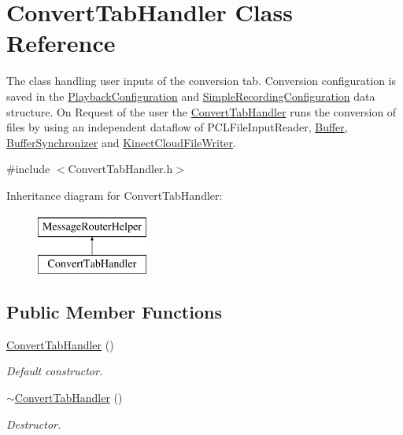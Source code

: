 \hypertarget{class_convert_tab_handler}{}\section{Convert\+Tab\+Handler Class Reference}
\label{class_convert_tab_handler}


The class handling user inputs of the conversion tab. Conversion configuration is saved in the \hyperlink{class_playback_configuration}{Playback\+Configuration} and \hyperlink{class_simple_recording_configuration}{Simple\+Recording\+Configuration} data structure. On Request of the user the \hyperlink{class_convert_tab_handler}{Convert\+Tab\+Handler} runs the conversion of files by using an independent dataflow of P\+C\+L\+File\+Input\+Reader, \hyperlink{class_buffer}{Buffer}, \hyperlink{class_buffer_synchronizer}{Buffer\+Synchronizer} and \hyperlink{class_kinect_cloud_file_writer}{Kinect\+Cloud\+File\+Writer}.  




{\ttfamily \#include $<$Convert\+Tab\+Handler.\+h$>$}

Inheritance diagram for Convert\+Tab\+Handler\+:\begin{figure}[H]
\begin{center}
\leavevmode
\includegraphics[height=2.000000cm]{class_convert_tab_handler}
\end{center}
\end{figure}
\subsection*{Public Member Functions}
\begin{DoxyCompactItemize}
\item 
\hypertarget{class_convert_tab_handler_a0b6269a64b74246db4c04b5281bcb034}{}\hyperlink{class_convert_tab_handler_a0b6269a64b74246db4c04b5281bcb034}{Convert\+Tab\+Handler} ()\label{class_convert_tab_handler_a0b6269a64b74246db4c04b5281bcb034}

\begin{DoxyCompactList}\small\item\em Default constructor. \end{DoxyCompactList}\item 
\hypertarget{class_convert_tab_handler_a11430d4b374f1144f13369c49db193de}{}\hyperlink{class_convert_tab_handler_a11430d4b374f1144f13369c49db193de}{$\sim$\+Convert\+Tab\+Handler} ()\label{class_convert_tab_handler_a11430d4b374f1144f13369c49db193de}

\begin{DoxyCompactList}\small\item\em Destructor. \end{DoxyCompactList}\end{DoxyCompactItemize}
